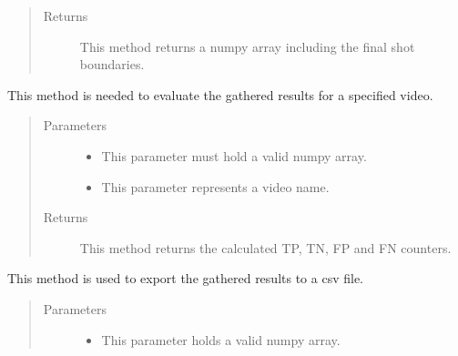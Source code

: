 \documentclass[letterpaper,10pt,english,openany,oneside]{sphinxmanual}
\begin{document}
\begin{fulllineitems}
\begin{fulllineitems}
\begin{quote}
\begin{description}
\item[{Returns}] \leavevmode
This method returns a numpy array including the final shot boundaries.

\end{description}\end{quote}

\end{fulllineitems}


\begin{fulllineitems}
\label{\detokenize{Evaluation:sbd.Evaluation.Evaluation.evaluation}}
This method is needed to evaluate the gathered results for a specified video.
\begin{quote}\begin{description}
\item[{Parameters}] \leavevmode\begin{itemize}
\item {} 
 \textendash{} This parameter must hold a valid numpy array.

\item {} 
 \textendash{} This parameter represents a video name.

\end{itemize}

\item[{Returns}] \leavevmode
This method returns the calculated TP, TN, FP and FN counters.

\end{description}\end{quote}

\end{fulllineitems}


\begin{fulllineitems}
\label{\detokenize{Evaluation:sbd.Evaluation.Evaluation.export2CSV}}
This method is used to export the gathered results to a csv file.
\begin{quote}\begin{description}
\item[{Parameters}] \leavevmode\begin{itemize}
\item {} 
 \textendash{} This parameter holds a valid numpy array.


\end{itemize}
\end{description}
\end{quote}
\end{fulllineitems}
\end{fulllineitems}
\end{document}

